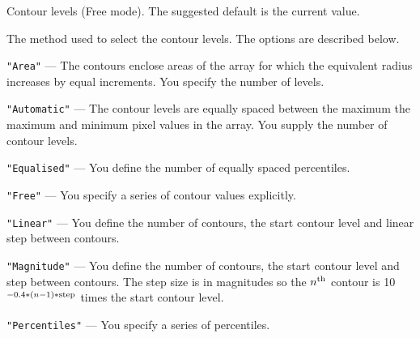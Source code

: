\documentclass[twoside,11pt]{article}
\newcommand{\sstsubsection}[1]{ \item[{#1}] \mbox{} \\}
\renewcommand{\sstsubsection}[1]{\item[{#1}]}
\begin{document}
{{{      }{
         Contour levels (Free mode).  The suggested default is the
         current value.
      }
      \sstsubsection{
         MODE = LITERAL (Read)
      }{
         The method used to select the contour levels.  The options are
         described below.
         \begin{description}
         \item {\tt "Area"} --- The contours enclose areas of the array for
                         which the equivalent radius increases by equal
                         increments.  You specify the number of levels.
         \item {\tt "Automatic"} --- The contour levels are equally spaced between the maximum
                        the maximum and minimum pixel values in the
                        array.  You supply the number of contour levels.
         \item {\tt "Equalised"} --- You define the number of equally spaced
                          percentiles.
         \item {\tt "Free"} --- You specify a series of contour values
                        explicitly.
         \item {\tt "Linear"} --- You define the number of contours, the start
                        contour level and linear step between contours.
         \item {\tt "Magnitude"} --- You define the number of contours, the start
                        contour level and step between contours.  The
                        step size is in magnitudes so the $n^{\rm th}$
                        contour is 10$^{-0.4*(n-1)*{\rm step}}$ times the
                        start contour level.
         \item {\tt "Percentiles"} --- You specify a series of percentiles.
         \end{description}

}}}
\end{document}
